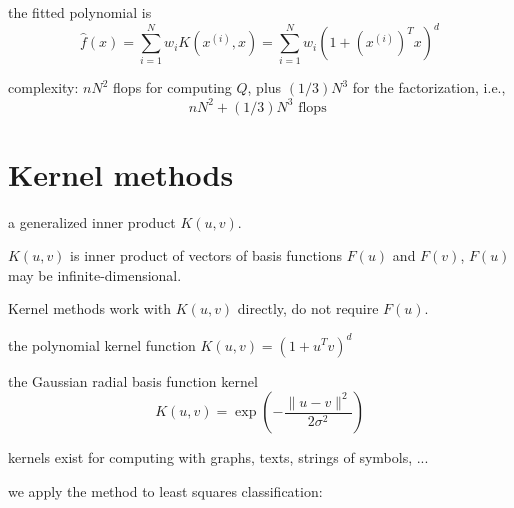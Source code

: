 the fitted polynomial is
\begin{equation}
\hat{f}(x)=\sum_{i=1}^{N} w_{i} K\left(x^{(i)}, x\right)=\sum_{i=1}^{N} w_{i}\left(1+\left(x^{(i)}\right)^{T} x\right)^{d}
\end{equation}


complexity: $ n N^{2} $ flops for computing $ Q $, plus $ (1 / 3) N^{3} $ for the factorization, i.e.,
\begin{equation}
n N^{2}+(1 / 3) N^{3} \text { flops }
\end{equation}

\section{Kernel methods}

\begin{definition}
    a generalized inner product $ K(u, v) $.
\end{definition}

$ K(u, v) $ is inner product of vectors of basis functions $ F(u) $ and $ F(v) $, $ F(u) $ may be infinite-dimensional.

Kernel methods work with $ K(u, v) $ directly, do not require $ F(u) $.

\begin{example}
    the polynomial kernel function $ K(u, v)=\left(1+u^{T} v\right)^{d} $
\end{example}

\begin{example}
    the Gaussian radial basis function kernel
\begin{equation}
K(u, v)=\exp \left(-\frac{\|u-v\|^{2}}{2 \sigma^{2}}\right)
\end{equation}
\end{example}

\begin{example}
    kernels exist for computing with graphs, texts, strings of symbols, ...
\end{example}


we apply the method  to least squares classification:

